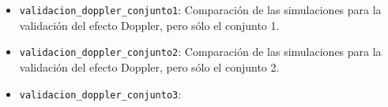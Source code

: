 \documentclass[12pt]{report} %
\begin{document}
\begin{itemize}
\item \verb|validacion_doppler_conjunto1|:
Comparación de las simulaciones para la validación del efecto Doppler,
pero sólo el conjunto 1.
\item \verb|validacion_doppler_conjunto2|:
Comparación de las simulaciones para la validación del efecto Doppler,
pero sólo el conjunto 2.
\item \verb|validacion_doppler_conjunto3|:

\end{itemize}
\end{document}
